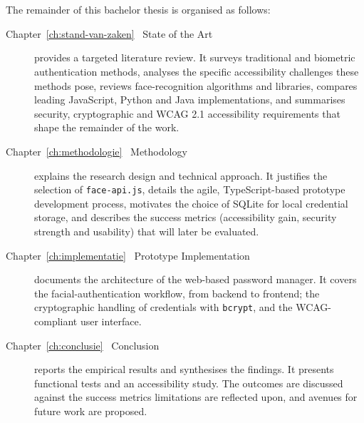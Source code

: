 \section{}
\label{sec:opzet-bachelorproef}

The remainder of this bachelor thesis is organised as follows:

\begin{description}
  \item[Chapter~\ref{ch:stand-van-zaken} \textemdash\ State of the Art] provides a targeted literature review.  
        It surveys traditional and biometric authentication methods,  
        analyses the specific accessibility challenges these methods pose,  
        reviews face-recognition algorithms and libraries,  
        compares leading JavaScript, Python and Java implementations, and  
        summarises security, cryptographic and WCAG 2.1 accessibility requirements that shape the remainder of the work.

  \item[Chapter~\ref{ch:methodologie} \textemdash\ Methodology] explains the research design and technical approach.  
        It justifies the selection of \texttt{face-api.js}, details the agile, TypeScript-based prototype development process, motivates the choice of SQLite for local credential storage, and describes the success metrics (accessibility gain, security strength and usability) that will later be evaluated.

  \item[Chapter~\ref{ch:implementatie} \textemdash\ Prototype Implementation] documents the architecture of the web-based password manager.  
        It covers the facial-authentication workflow, from backend to frontend; the cryptographic handling of credentials with \texttt{bcrypt}, and the WCAG-compliant user interface.

  \item[Chapter~\ref{ch:conclusie} \textemdash\ Conclusion] reports the empirical results and synthesises the findings. 
        It presents functional tests and an accessibility study. The outcomes are discussed against the success metrics limitations are reflected upon, and avenues for future work are proposed.
\end{description}
